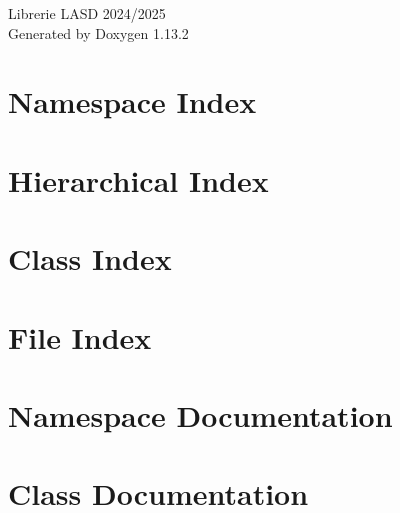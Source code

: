 \documentclass[twoside]{book}
\newcommand{\+}{\discretionary{\mbox{\scriptsize$\hookleftarrow$}}{}{}}
\newcommand{\clearemptydoublepage}{%
    \newpage{\pagestyle{empty}\cleardoublepage}%
  }
\begin{document}
  \raggedbottom
    \hypersetup{pageanchor=false,
                bookmarksnumbered=true,
                pdfencoding=unicode
               }
  \begin{titlepage}
  \vspace*{7cm}
  \begin{center}%
  {\Large Librerie LASD 2024/2025}\\
  \vspace*{1cm}
  {\large Generated by Doxygen 1.13.2}\\
  \end{center}
  \end{titlepage}
  \clearemptydoublepage
  \tableofcontents
  \clearemptydoublepage
  \hypersetup{pageanchor=true}
\chapter{Namespace Index}

\chapter{Hierarchical Index}

\chapter{Class Index}

\chapter{File Index}

\chapter{Namespace Documentation}

\chapter{Class Documentation}






















\end{document}
